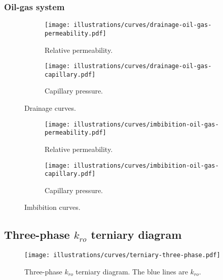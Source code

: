 \subsubsection{Oil-gas system} %
\label{ssub:oil_gas_system}

\begin{figure}[H]
    \centering
    \begin{subfigure}[b]{0.45\textwidth}
            \texttt{[image: illustrations/curves/drainage-oil-gas-permeability.pdf]}
            \caption{Relative permeability.}
            \label{fig:drain_oil_gas_perm}
    \end{subfigure}%
    \quad
    \begin{subfigure}[b]{0.45\textwidth}
            \texttt{[image: illustrations/curves/drainage-oil-gas-capillary.pdf]}
            \caption{Capillary pressure.}
            \label{fig:drain_oil_gas_cap}
    \end{subfigure}
    \caption{Drainage curves.}
\end{figure}


\begin{figure}[H]
    \centering
    \begin{subfigure}[b]{0.45\textwidth}
            \texttt{[image: illustrations/curves/imbibition-oil-gas-permeability.pdf]}
            \caption{Relative permeability.}
            \label{fig:imb_oil_gas_perm}
    \end{subfigure}%
    \quad
    \begin{subfigure}[b]{0.45\textwidth}
            \texttt{[image: illustrations/curves/imbibition-oil-gas-capillary.pdf]}
            \caption{Capillary pressure.}
            \label{fig:imb_oil_gas_cap}
    \end{subfigure}
    \caption{Imbibition curves.}
\end{figure}


\subsection{Three-phase $k_{ro}$ terniary diagram} %
\label{sub:three_phase_k_terniary}

\begin{figure}[G]
    \centering
    \texttt{[image: illustrations/curves/terniary-three-phase.pdf]}
    \caption{Three-phase $k_{ro}$ terniary diagram. The blue lines are $k_{ro}$.}
    \label{fig:terniary}
\end{figure}

